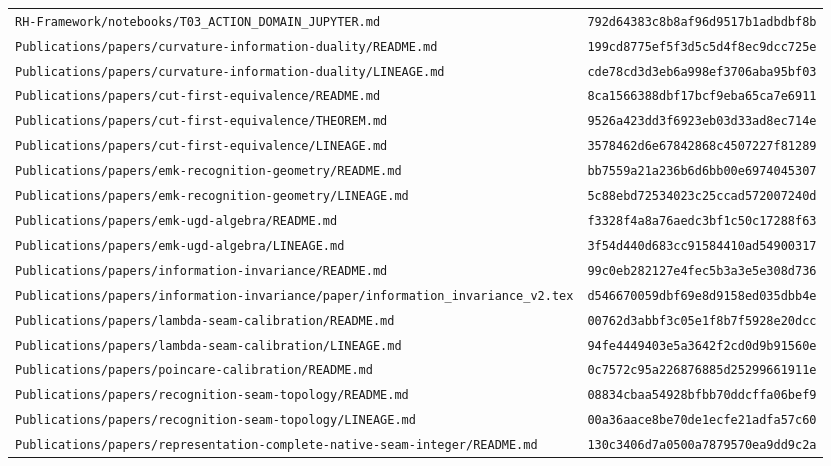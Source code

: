 \documentclass[11pt,openany]{book}
\begin{document}
\begin{small}
\begin{longtable}{p{}p{}}
\texttt{RH-Framework/notebooks/T03\_ACTION\_DOMAIN\_JUPYTER.md} & \texttt{792d64383c8b8af96d9517b1adbdbf8b}\\
\texttt{Publications/papers/curvature-information-duality/README.md} & \texttt{199cd8775ef5f3d5c5d4f8ec9dcc725e}\\
\texttt{Publications/papers/curvature-information-duality/LINEAGE.md} & \texttt{cde78cd3d3eb6a998ef3706aba95bf03}\\
\texttt{Publications/papers/cut-first-equivalence/README.md} & \texttt{8ca1566388dbf17bcf9eba65ca7e6911}\\
\texttt{Publications/papers/cut-first-equivalence/THEOREM.md} & \texttt{9526a423dd3f6923eb03d33ad8ec714e}\\
\texttt{Publications/papers/cut-first-equivalence/LINEAGE.md} & \texttt{3578462d6e67842868c4507227f81289}\\
\texttt{Publications/papers/emk-recognition-geometry/README.md} & \texttt{bb7559a21a236b6d6bb00e6974045307}\\
\texttt{Publications/papers/emk-recognition-geometry/LINEAGE.md} & \texttt{5c88ebd72534023c25ccad572007240d}\\
\texttt{Publications/papers/emk-ugd-algebra/README.md} & \texttt{f3328f4a8a76aedc3bf1c50c17288f63}\\
\texttt{Publications/papers/emk-ugd-algebra/LINEAGE.md} & \texttt{3f54d440d683cc91584410ad54900317}\\
\texttt{Publications/papers/information-invariance/README.md} & \texttt{99c0eb282127e4fec5b3a3e5e308d736}\\
\texttt{Publications/papers/information-invariance/paper/information\_invariance\_v2.tex} & \texttt{d546670059dbf69e8d9158ed035dbb4e}\\
\texttt{Publications/papers/lambda-seam-calibration/README.md} & \texttt{00762d3abbf3c05e1f8b7f5928e20dcc}\\
\texttt{Publications/papers/lambda-seam-calibration/LINEAGE.md} & \texttt{94fe4449403e5a3642f2cd0d9b91560e}\\
\texttt{Publications/papers/poincare-calibration/README.md} & \texttt{0c7572c95a226876885d25299661911e}\\
\texttt{Publications/papers/recognition-seam-topology/README.md} & \texttt{08834cbaa54928bfbb70ddcffa06bef9}\\
\texttt{Publications/papers/recognition-seam-topology/LINEAGE.md} & \texttt{00a36aace8be70de1ecfe21adfa57c60}\\
\texttt{Publications/papers/representation-complete-native-seam-integer/README.md} & \texttt{130c3406d7a0500a7879570ea9dd9c2a}\\

\end{longtable}
\end{small}
\end{document}
